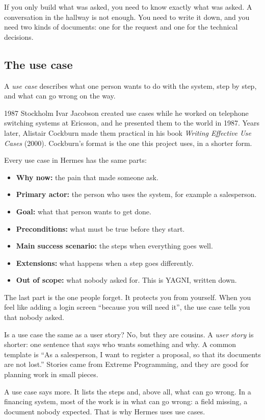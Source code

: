 If you only build what was asked, you need to know exactly what was asked. A
conversation in the hallway is not enough. You need to write it down, and you
need two kinds of documents: one for the request and one for the technical
decisions.

\subsection*{The use case}

A \emph{use case} describes what one person wants to do with the system, step
by step, and what can go wrong on the way.

\begin{history}{1987 \textperiodcentered{} Stockholm}
Ivar Jacobson created use cases while he worked on telephone switching
systems at Ericsson, and he presented them to the world in 1987. Years later,
Alistair Cockburn made them practical in his book \emph{Writing Effective Use
Cases} (2000). Cockburn's format is the one this project uses, in a shorter
form.
\end{history}

Every use case in Hermes has the same parts:

\begin{itemize}
  \item \textbf{Why now:} the pain that made someone ask.
  \item \textbf{Primary actor:} the person who uses the system, for example a
        salesperson.
  \item \textbf{Goal:} what that person wants to get done.
  \item \textbf{Preconditions:} what must be true before they start.
  \item \textbf{Main success scenario:} the steps when everything goes well.
  \item \textbf{Extensions:} what happens when a step goes differently.
  \item \textbf{Out of scope:} what nobody asked for. This is YAGNI, written
        down.
\end{itemize}

The last part is the one people forget. It protects you from yourself. When
you feel like adding a login screen ``because you will need it'', the use case
tells you that nobody asked.

\begin{question}{Is a use case the same as a user story?}
No, but they are cousins. A \emph{user story} is shorter: one sentence that
says who wants something and why. A common template is ``As a salesperson, I
want to register a proposal, so that its documents are not lost.'' Stories
came from Extreme Programming, and they are good for planning work in small
pieces.

A use case says more. It lists the steps and, above all, what can go wrong.
In a financing system, most of the work is in what can go wrong: a field
missing, a document nobody expected. That is why Hermes uses use cases.
\end{question}

